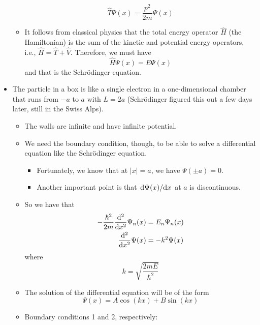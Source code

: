 \documentclass[../notes.tex]{subfiles}
\begin{document}
\begin{itemize}
\begin{itemize}
        \begin{equation*}
            \hat{T}\Psi(x) = \frac{p^2}{2m}\Psi(x)
        \end{equation*}
        \item It follows from classical physics that the total energy operator $\hat{H}$ (the Hamiltonian) is the sum of the kinetic and potential energy operators, i.e., $\hat{H}=\hat{T}+\hat{V}$. Therefore, we must have
        \begin{equation*}
            \hat{H}\Psi(x) = E\Psi(x)
        \end{equation*}
        and that is the Schr\"{o}dinger equation.
    \end{itemize}
    \item The particle in a box is like a single electron in a one-dimensional chamber that runs from $-a$ to $a$ with $L=2a$ (Schr\"{o}dinger figured this out a few days later, still in the Swiss Alps).
    \begin{itemize}
        \item The walls are infinite and have infinite potential.
        \item We need the boundary condition, though, to be able to solve a differential equation like the Schr\"{o}dinger equation.
        \begin{itemize}
            \item Fortunately, we know that at $|x|=a$, we have $\Psi(\pm a)=0$.
            \item Another important point is that $\dv*{\Psi(x)}{x}$ at $a$ is discontinuous.
        \end{itemize}
        \item So we have that
        \begin{align*}
            -\frac{\hbar^2}{2m}\dv[2]{x}\Psi_n(x) &= E_n\Psi_n(x)\\
            \dv[2]{x}\Psi(x) &= -k^2\Psi(x)
        \end{align*}
        where
        \begin{equation*}
            k = \sqrt{\frac{2mE}{\hbar^2}}
        \end{equation*}
        \item The solution of the differential equation will be of the form
        \begin{equation*}
            \Psi(x) = A\cos(kx)+B\sin(kx)
        \end{equation*}
        \item Boundary conditions 1 and 2, respectively:

\end{itemize}
\end{itemize}
\end{document}
